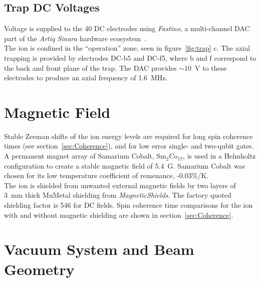 \subsection{Trap DC Voltages}
    Voltage is supplied to the 40 DC electrodes using \emph{Fastino}, a
    multi-channel DAC part of the \emph{Artiq Sinara} hardware
    ecosystem~\cite{}.\\
    The ion is confined in the ``operation'' zone, seen in
    figure~\ref{fig:trap} c. The axial trapping is provided by electrodes
    DC-b5 and DC-f5, where b and f correspond to the back and front plane of the trap. 
    The DAC provides $\sim 10$~V to these electrodes to produce an axial frequency of 1.6~MHz.
    
\section{Magnetic Field}
\label{sec:Magnetic Field}
    Stable Zeeman shifts of the ion energy levels are required for long spin
    coherence times (see section~\ref{sec:Coherence}), and for low error single-
    and two-qubit gates. A permanent magnet array of Samarium Cobalt,
    Sm$_2$Co$_17$, is used in a Helmholtz configuration to create a stable magnetic
    field of 5.4~G. Samarium Cobalt was chosen for its low temperature
    coefficient of remenance, -0.03\%/K.\\
    The ion is shielded from unwanted external magnetic fields by two layers of
    3~mm thick MuMetal shielding from \emph{MagneticShields}. The factory quoted
    shielding factor is 546 for DC fields. Spin coherence time comparisons for
    the ion with and without magnetic shielding are shown in
    section~\ref{sec:Coherence}.\\

\section{Vacuum System and Beam Geometry}
\label{sec:Vacuum System}


